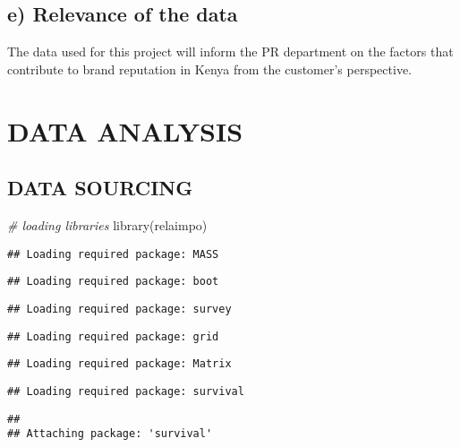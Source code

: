 \documentclass[
]{article}
\newenvironment{Shaded}{\begin{snugshade}}{\end{snugshade}}
\newcommand{\CommentTok}[1]{\textcolor[rgb]{0.56,0.35,0.01}{\textit{#1}}}
\newcommand{\FunctionTok}[1]{\textcolor[rgb]{0.00,0.00,0.00}{#1}}
\newcommand{\NormalTok}[1]{#1}
\begin{document}
\hypertarget{e-relevance-of-the-data}{%
\subsection{\texorpdfstring{\textbf{e) Relevance of the
data}}{e) Relevance of the data}}\label{e-relevance-of-the-data}}

The data used for this project will inform the PR department on the
factors that contribute to brand reputation in Kenya from the customer's
perspective.

\hypertarget{data-analysis}{%
\section{DATA ANALYSIS}\label{data-analysis}}

\hypertarget{data-sourcing}{%
\subsection{DATA SOURCING}\label{data-sourcing}}

\begin{Shaded}
\begin{Highlighting}[]
\CommentTok{\# loading libraries}
\FunctionTok{library}\NormalTok{(relaimpo)}
\end{Highlighting}
\end{Shaded}

\begin{verbatim}
## Loading required package: MASS
\end{verbatim}

\begin{verbatim}
## Loading required package: boot
\end{verbatim}

\begin{verbatim}
## Loading required package: survey
\end{verbatim}

\begin{verbatim}
## Loading required package: grid
\end{verbatim}

\begin{verbatim}
## Loading required package: Matrix
\end{verbatim}

\begin{verbatim}
## Loading required package: survival
\end{verbatim}

\begin{verbatim}
## 
## Attaching package: 'survival'
\end{verbatim}
\end{document}
